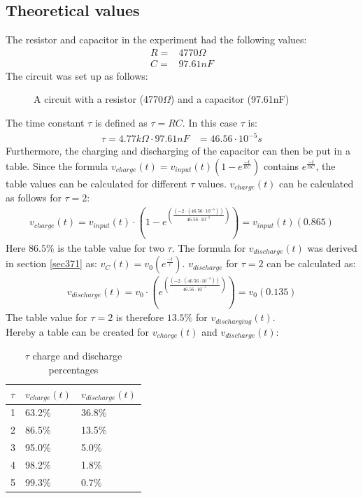\subsection{Theoretical values}
The resistor and capacitor in the experiment had the following values:
\begin{align*}
 R =& 4770\Omega \\
 C =& 97.61nF
\end{align*}
The circuit was set up as follows:
\begin{figure}[H]
	
	\caption{A circuit with a resistor (4770$\Omega$) and a capacitor (97.61nF)}
\end{figure}
\noindent The time constant $\tau$ is defined as $\tau = RC$. In this case $\tau$ is:
\begin{align*}
	\tau = 4.77 k\Omega \cdot 97.61 nF &= 46.56 \cdot 10^{-5} s
\end{align*}
Furthermore, the charging and discharging of the capacitor can then be put in a table. Since the formula $v_{charge}(t)=v_{input}(t)(1-e^{\frac{-t}{RC}})$ contains $e^{\frac{-t}{RC}}$, the table values can be calculated for different $\tau$ values. $v_{charge}(t)$ can be calculated as follows for $\tau = 2$: 
\begin{align*}
v_{charge}(t)=v_{input}(t) \cdot \left(1-e^{\left(\frac{\left(-2 \cdot \left(46.56 \cdot 10^{-5} \right)\right)}{46.56 \cdot 10^{-5}}\right)} \right) = v_{input}(t)(0.865)
\end{align*}
Here $86.5\%$ is the table value for two $\tau$. The formula for $v_{discharge}(t)$ was derived in section \ref{sec371} as: $v_{C}(t)=v_{0} \left(e^{\frac{-t}{\tau}} \right)$. $v_{discharge}$ for $\tau = 2$ can be calculated as:
\begin{align*}
v_{discharge}(t)=v_{0} \cdot \left(e^{\left(\frac{\left(-2 \cdot \left(46.56 \cdot 10^{-5} \right)\right)}{46.56 \cdot 10^{-5}}\right)} \right) = v_{0}(0.135)
\end{align*}
The table value for $\tau = 2$ is therefore $13.5 \%$ for $v_{discharging}(t)$. \\
Hereby a table can be created for $v_{charge}(t)$ and $v_{discharge}(t)$: \\
\begin{table}[H]
\center
\begin{tabular}{|l|l|l|}
\hline
$\tau$ & $v_{charge}(t)$ & $v_{discharge}(t)$ \\ \hline
1      & 63.2\%       & 36.8\%         \\ \hline
2      & 86.5\%       & 13.5\%         \\ \hline
3      & 95.0\%       & 5.0\%          \\ \hline
4      & 98.2\%       & 1.8\%          \\ \hline
5      & 99.3\%       & 0.7\%          \\ \hline
\end{tabular}
\caption{$\tau$ charge and discharge percentages}
\end{table}
